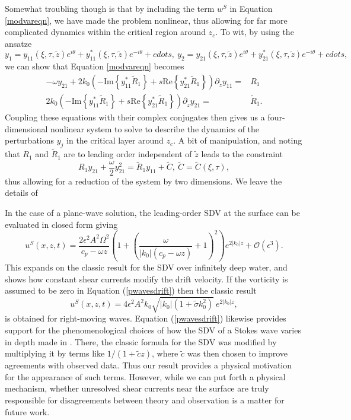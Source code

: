 \documentclass{JFM_Style/jfm}
\newcommand{\pd}{\partial}
\begin{document}
 Somewhat troubling though is that by including the term $w^{S}$ in Equation \eqref{modvareqn}, we have made the problem nonlinear, thus allowing for far more complicated dynamics within the critical region around $z_{c}$.  To wit, by using the ansatze 
 \[
 y_{1} = y_{11}(\xi,\tau,\tilde{z})e^{i\theta} + y_{11}^{\ast}(\xi,\tau,\tilde{z})e^{-i\theta} + cdots, ~  y_{2} = y_{21}(\xi,\tau,\tilde{z})e^{i\theta} + y_{21}^{\ast}(\xi,\tau,\tilde{z})e^{-i\theta} + cdots,
 \]
 we can show that Equation \eqref{modvareqn} becomes 
 \begin{align*}
 -\omega y_{21} + 2k_{0}\left(-\mbox{Im}\left\{y_{11}^{\ast}\tilde{R}_{1}\right\}+s\mbox{Re}\left\{y_{21}^{\ast}\tilde{R}_{1}\right\}\right)\pd_{\tilde{z}}y_{11} = & R_{1}\\
2k_{0}\left(-\mbox{Im}\left\{y_{11}^{\ast}\tilde{R}_{1}\right\}+s\mbox{Re}\left\{y_{21}^{\ast}\tilde{R}_{1}\right\}\right)\pd_{\tilde{z}}y_{21} = & \tilde{R}_{1}.
 \end{align*}
 Coupling these equations with their complex conjugates then gives us a four-dimensional nonlinear system to solve to describe the dynamics of the perturbations $y_{j}$ in the critical layer around $z_{c}$.  A bit of manipulation, and noting that $R_{1}$ and $\tilde{R}_{1}$ are to leading order independent of $\tilde{z}$ leads to the constraint
 \[
 R_{1}y_{21} + \frac{\omega}{2}y_{21}^{2} = \tilde{R}_{1}y_{11} + \tilde{C}, ~ \tilde{C} = \tilde{C}(\xi,\tau),
 \]
 thus allowing for a reduction of the system by two dimensions.  We leave the details of  
 
In the case of a plane-wave solution, the leading-order SDV at the surface can be evaluated in closed form giving  
\begin{equation}
u^{S}(x,z,t) = \frac{2\epsilon^{2}A^{2}\Omega^{2}}{c_{p}-\omega z} \left(1 + \left(\frac{\omega}{|k_{0}|(c_{p} - \omega z )} + 1\right)^{2} \right) e^{2|k_{0}|z} + \mathcal{O}(\epsilon^{3}).
\label{pwavesdrift}
\end{equation}
This expands on the classic result for the SDV over infinitely deep water, and shows how constant shear currents modify the drift velocity.  If the vorticity is assumed to be zero in Equation (\ref{pwavesdrift}) then the classic result
\begin{equation}
u^{S}(x,z,t) = 4\epsilon^2A^2k_0\sqrt{|k_0|(1+\tilde{\sigma}k_0^2)}~e^{2|k_0|z},
\end{equation}
is obtained for right-moving waves.  Equation (\ref{pwavesdrift}) likewise provides support for the phenomenological choices of how the SDV of a Stokes wave varies in depth made in \cite{breivik}.  There, the classic formula for the SDV was modified by multiplying it by terms like $1/(1+\tilde{c}z)$, where $\tilde{c}$ was then chosen to improve agreements with observed data.  Thus our result provides a physical motivation for the appearance of such terms.  However, while we can put forth a physical mechanism, whether unresolved shear currents near the surface are truly responsible for disagreements between theory and observation is a matter for future work.     
\end{document}
